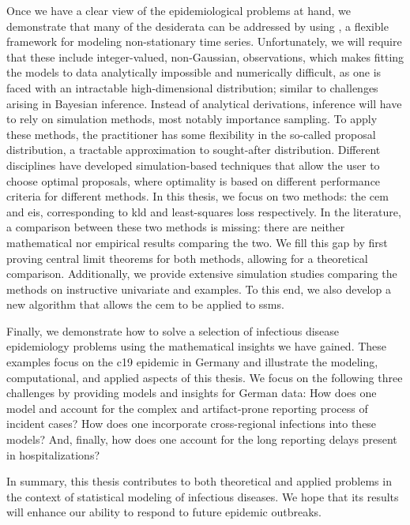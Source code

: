 Once we have a clear view of the epidemiological problems at hand, we demonstrate that many of the desiderata can be addressed by using , a flexible framework for modeling non-stationary time series. Unfortunately, we will require that these  include integer-valued, non-Gaussian, observations, which makes fitting the models to data analytically impossible and numerically difficult, as one is faced with an intractable high-dimensional distribution; similar to challenges arising in Bayesian inference. Instead of analytical derivations, inference will have to rely on simulation methods, most notably importance sampling. To apply these methods, the practitioner has some flexibility in the so-called proposal distribution, a tractable approximation to sought-after distribution. Different disciplines have developed simulation-based techniques that allow the user to choose optimal proposals, where optimality is based on different performance criteria for different methods. In this thesis, we focus on two methods: the \gls{cem} and \gls{eis}, corresponding to \acrlong{kld} and least-squares loss respectively. In the literature, a comparison between these two methods is missing: there are neither mathematical nor empirical results comparing the two. We fill this gap by first proving central limit theorems for both methods, allowing for a theoretical comparison. Additionally, we provide extensive simulation studies comparing the methods on instructive univariate and  examples. To this end, we also develop a new algorithm that allows the \acrshort{cem} to be applied to \glspl{ssm}. 

Finally, we demonstrate how to solve a selection of infectious disease epidemiology problems using the mathematical insights we have gained. These examples focus on the \acrshort{c19} epidemic in Germany and illustrate the modeling, computational, and applied aspects of this thesis. We focus on the following three challenges by providing models and insights for German data: How does one model and account for the complex and artifact-prone reporting process of incident cases? How does one incorporate cross-regional infections into these models? And, finally, how does one account for the long reporting delays present in hospitalizations?

In summary, this thesis contributes to both theoretical and applied problems in the context of statistical modeling of infectious diseases. 
We hope that its results will enhance our ability to respond to future epidemic outbreaks.
